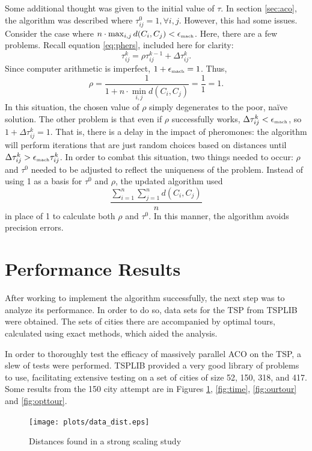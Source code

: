 \documentclass[twocolumn]{article}
\begin{document}
Some additional thought was given to the initial value of $\tau$. In section \ref{sec:aco},
the algorithm was described where $\tau^0_{ij} = 1,\forall i,j$. However,
this had some issues. Consider the case where $n\cdot \max_{i,j} d(C_i,C_j) < 
\epsilon_{\mbox{{\tiny mach}}}$. Here,
there are a few problems. Recall equation \eqref{eq:phers}, included here for clarity:
\[ \tau^k_{ij} = \rho \tau^{k-1}_{ij} + \Delta \tau^k_{ij}. \]
Since computer arithmetic is imperfect, $1 + \epsilon_{\mbox{{\tiny mach}}} = 1$. Thus, 
\[\rho = \frac{1}{\displaystyle 1+n\cdot \min_{i,j} d(C_i,C_j)} = \frac{1}{1} = 1. \]
In this situation, the chosen value of $\rho$ simply degenerates to the poor, 
na\"{i}ve solution. The other problem is that even if $\rho$ successfully works, 
$\Delta \tau^k_{ij} < \epsilon_{\mbox{{\tiny mach}}}$, so $1 + \Delta \tau^k_{ij} = 1$. That is,
there is a delay in the impact of pheromones: the algorithm will perform iterations that 
are just random choices based on distances until 
$\Delta \tau^k_{ij} > \epsilon_{\mbox{{\tiny mach}}}\tau^k_{ij}$. In order to combat this situation,
two things needed to occur: $\rho$ and $\tau^0$ needed to be adjusted to reflect the uniqueness
of the problem. Instead of using 1 as a basis for $\tau^0$ and $\rho$, the updated algorithm
used 
\[ \frac{\displaystyle \sum_{i=1}^n \sum_{j=1}^n d(C_i,C_j)}{n} \]
in place of 1 to calculate both $\rho$ and $\tau^0$. In this manner, the algorithm 
avoids precision errors.

\section{Performance Results}

After working to implement the algorithm successfully, the next step was to
analyze its performance. In order to do so, data sets
for the TSP from TSPLIB \cite{tsplib} were obtained. The sets of cities
there are accompanied by optimal tours, calculated using exact methods, which
aided the analysis. 

In order to thoroughly test the efficacy of massively parallel ACO on the TSP,
a slew of tests were performed. TSPLIB provided a very good library of problems
to use, facilitating extensive testing on a set of cities of size 52, 150,
318, and 417. Some results from the 150 city attempt are in Figures \ref{fig:dist},
\ref {fig:time}, \ref{fig:ourtour} and \ref{fig:opttour}. 

\begin{figure}
  \centering
  \texttt{[image: plots/data\_dist.eps]}
  \caption{Distances found in a strong scaling study} \label{fig:dist}
\end{figure}
\end{document}
